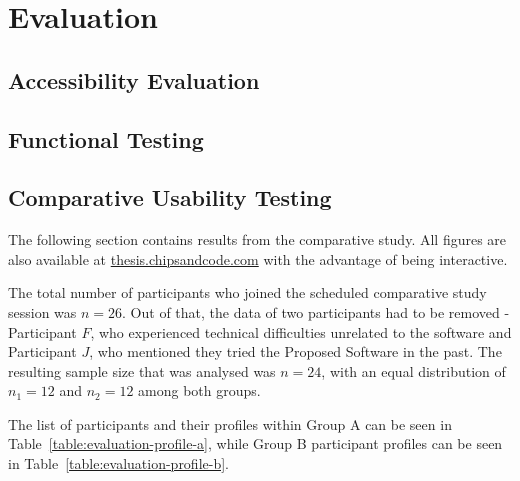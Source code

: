 \chapter{Evaluation}


\section{Accessibility Evaluation}
\label{Evaluation-Accessibility}


\section{Functional Testing}
\label{Evaluation-Tests}



\section{Comparative Usability Testing}
\label{Evaluation-UX}

The following section contains results from the comparative study.
All figures are also available at \href{https://thesis.chipsandcode.com}{thesis.chipsandcode.com} with the advantage of being interactive.

The total number of participants who joined the scheduled comparative study session was $n=26$.
Out of that, the data of two participants had to be removed - Participant $F$, who experienced technical difficulties unrelated to the software and Participant $J$, who mentioned they tried the Proposed Software in the past.
The resulting sample size that was analysed was $n=24$, with an equal distribution of $n_1=12$ and $n_2=12$ among both groups.

The list of participants and their profiles within Group A can be seen in Table~\ref{table:evaluation-profile-a}, while Group B participant profiles can be seen in Table~\ref{table:evaluation-profile-b}.

